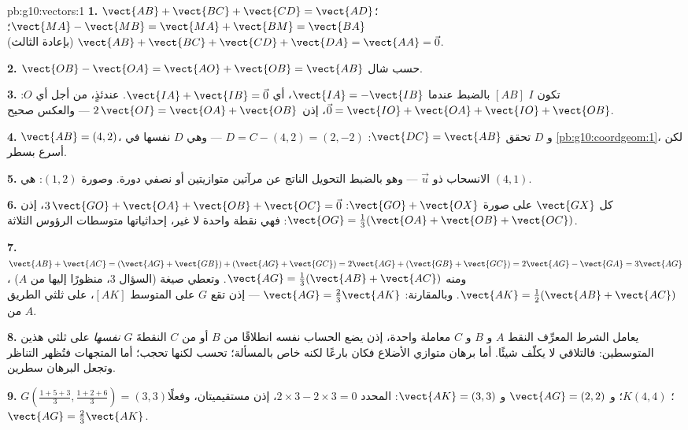\begin{solution}{pb:g10:vectors:1}
\textbf{1.} $\vect{AB} + \vect{BC} + \vect{CD} = \vect{AD}$؛
\quad $\vect{MA} - \vect{MB} = \vect{MA} + \vect{BM} =
\vect{BA}$؛ \quad $\vect{AB} + \vect{BC} + \vect{CD} +
\vect{DA} = \vect{AA} = \vec 0$ (بإعادة   الثالث).

\textbf{2.} $\vect{OB} - \vect{OA} = \vect{AO} + \vect{OB} =
\vect{AB}$ حسب شال.

\textbf{3.} تكون $I$  $[AB]$ بالضبط عندما
$\vect{IA} = -\vect{IB}$، أي
$\vect{IA} + \vect{IB} = \vec 0$. عندئذٍ، من أجل أي $O$:
$\vec 0 = \vect{IO} + \vect{OA} + \vect{IO} + \vect{OB}$، إذن
$2\,\vect{OI} = \vect{OA} + \vect{OB}$ --- والعكس صحيح.

\textbf{4.} $\vect{AB} = (4, 2)$، و $D$ تحقق
$\vect{DC} = \vect{AB}$: $D = C - (4, 2) = (2, -2)$ --- وهي
$D$ نفسها في \cref{pb:g10:coordgeom:1}، لكن أسرع بسطر.

\textbf{5.} الانسحاب ذو  $\vec u$ --- وهو بالضبط
التحويل الناتج عن مرآتين متوازيتين أو نصفي
دورة. وصورة $(1, 2)$: هي $(4, 1)$.

\textbf{6.}  كل $\vect{GX}$ على صورة
$\vect{GO} + \vect{OX}$:
$3\,\vect{GO} + \vect{OA} + \vect{OB} + \vect{OC} = \vec 0$،
إذن $\vect{OG} = \frac13(\vect{OA} + \vect{OB} + \vect{OC})$:
فهي نقطة واحدة لا غير، إحداثياتها متوسطات 
الرؤوس الثلاثة.

\textbf{7.} $\vect{AB} + \vect{AC} =
(\vect{AG} + \vect{GB}) + (\vect{AG} + \vect{GC})
= 2\vect{AG} + (\vect{GB} + \vect{GC})
= 2\vect{AG} - \vect{GA} = 3\vect{AG}$، ومنه
$\vect{AG} = \frac13(\vect{AB} + \vect{AC})$. وتعطي صيغة
 (السؤال 3، منظورًا إليها من $A$)
$\vect{AK} = \frac12(\vect{AB} + \vect{AC})$. وبالمقارنة:
$\vect{AG} = \frac23\vect{AK}$ --- إذن تقع $G$ على المتوسط
$[AK]$، على ثلثي الطريق من $A$.

\textbf{8.} يعامل الشرط المعرِّف النقط $A$ و $B$ و $C$
معاملة واحدة، إذن يضع الحساب نفسه انطلاقًا من $B$ أو من $C$
النقطةَ $G$ \emph{نفسها} على ثلثي هذين المتوسطين:
فالتلاقي لا يكلّف شيئًا. أما برهان متوازي الأضلاع فكان
بارعًا لكنه خاص بالمسألة؛  تحسب لكنها تحجب؛
أما المتجهات فتُظهر التناظر وتجعل البرهان سطرين.

\textbf{9.} $G\left(\frac{1+5+3}{3}, \frac{1+2+6}{3}\right) =
(3, 3)$؛ $K(4, 4)$؛ و $\vect{AG} = (2, 2)$ و
$\vect{AK} = (3, 3)$: المحدد
$2 \times 3 - 2 \times 3 = 0$، إذن مستقيميتان، وفعلًا
$\vect{AG} = \frac23\vect{AK}$.


\end{solution}
